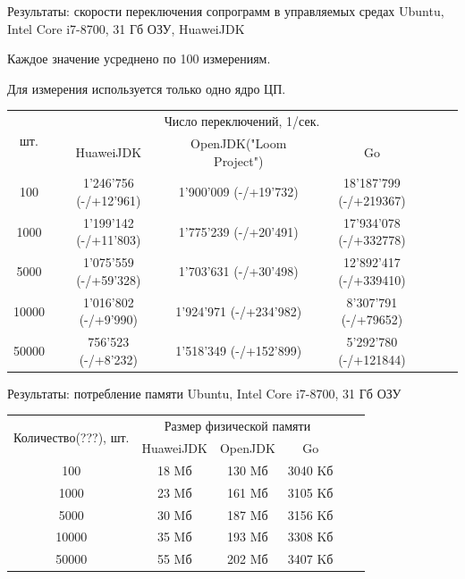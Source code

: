 \begin{frame}{Результаты: скорости переключения сопрограмм в управляемых средах}
	Ubuntu, Intel Core i7-8700, 31 Гб ОЗУ, HuaweiJDK
	\par Каждое значение усреднено по 100 измерениям. 
	\par Для измерения используется только одно ядро ЦП.
	
	\begin{table}[H]
		\begin{tabular}{|c|c|c|c|c|c|}
			\hline \multirow{2}{*}{шт.} & \multicolumn{3}{|c|}{Число переключений, 1/сек.}      \\
			\cline{2-4}    & HuaweiJDK              & OpenJDK("Loom Project") & Go                     \\
			\hline 100     & 1'246'756 (-/+12'961) & 1'900'009 (-/+19'732)    & 18'187'799 (-/+219367)    \\
			\hline 1000    & 1'199'142 (-/+11'803) & 1'775'239 (-/+20'491)    & 17'934'078 (-/+332778)    \\
			\hline 5000    & 1'075'559 (-/+59'328) & 1'703'631 (-/+30'498)    & 12'892'417 (-/+339410)    \\ %
			\hline 10000   & 1'016'802 (-/+9'990)  & 1'924'971 (-/+234'982)   & 8'307'791 (-/+79652)     \\ %
			\hline 50000   & 756'523 (-/+8'232)    & 1'518'349 (-/+152'899)   & 5'292'780 (-/+121844)    \\ %
			\hline 
		\end{tabular}
	\end{table}	
	
\end{frame}


\begin{frame}{Результаты: потребление памяти}
	Ubuntu, Intel Core i7-8700, 31 Гб ОЗУ
	\begin{table}[H]
		\begin{tabular}{|c|c|c|c|c|c|}
			\hline \multirow{2}{*}{Количество(???), шт.} & \multicolumn{3}{|c|}{Размер физической памяти}  \\
			\cline{2-4}    & HuaweiJDK  & OpenJDK   & Go      \\
			\hline 100     & 18 Mб       & 130 Mб     & 3040 Kб  \\
			\hline 1000    & 23 Mб       & 161 Mб     & 3105 Kб  \\
			\hline 5000    & 30 Mб       & 187 Mб     & 3156 Kб  \\
			\hline 10000   & 35 Mб       & 193 Mб     & 3308 Kб  \\
			\hline 50000   & 55 Mб       & 202 Mб     & 3407 Kб  \\ 
			\hline 
		\end{tabular}
	\end{table}
\end{frame}

